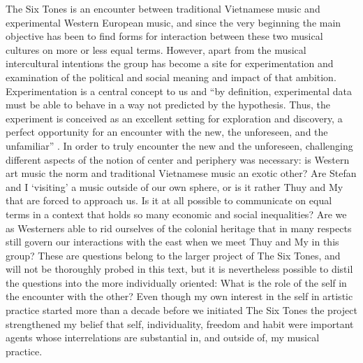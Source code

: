 \documentclass[a4paper]{article}
\begin{document}
The Six Tones is an encounter between traditional Vietnamese music and experimental Western European music, and since the very beginning the main objective has been to find forms for interaction between these two musical cultures on more or less equal terms. However, apart from the musical intercultural intentions the group has become a site for experimentation and examination of the political and social meaning and impact of that ambition. Experimentation is a central concept to us and ``by definition, experimental data must be able to behave in a way not predicted by the hypothesis. Thus, the experiment is conceived as an excellent setting for exploration and discovery, a perfect opportunity for an encounter with the new, the unforeseen, and the unfamiliar'' \citep[p. 165]{corbett2000}. In order to truly encounter the new and the unforeseen, challenging different aspects of the notion of center and periphery was necessary: is Western art music the norm and traditional Vietnamese music an exotic other? Are Stefan and I `visiting' a music outside of our own sphere, or is it rather Thuy and My that are forced to approach us. Is it at all possible to communicate on equal terms in a context that holds so many economic and social inequalities? Are we as Westerners able to rid ourselves of the colonial heritage that in many respects still govern our interactions with the east when we meet Thuy and My in this group? These are questions belong to the larger project of The Six Tones, and will not be thoroughly probed in this text, but it is nevertheless possible to distil the questions into the more individually oriented: What is the role of the self in the encounter with the other? Even though my own interest in the self in artistic practice started more than a decade before we initiated The Six Tones the project strengthened my belief that self, individuality, freedom and habit were important agents whose interrelations are substantial in, and outside of, my musical practice. 

\end{document}
